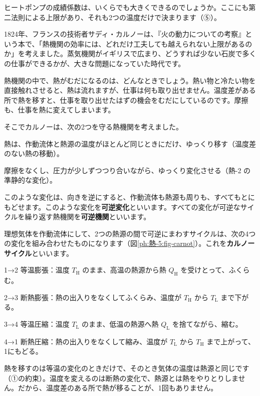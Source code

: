 ヒートポンプの成績係数は、いくらでも大きくできるのでしょうか。ここにも第二法則による上限があり、それも2つの温度だけで決まります（⑤）。

\label{ph:熱-5:sec5}
1824年、フランスの技術者サディ・カルノーは、『火の動力についての考察』という本で、「熱機関の効率には、どれだけ工夫しても越えられない上限があるのか」を考えました。蒸気機関がイギリスで広まり、どうすれば少ない石炭で多くの仕事ができるかが、大きな問題になっていた時代です。

熱機関の中で、熱がむだになるのは、どんなときでしょう。熱い物と冷たい物を直接触れさせると、熱は流れますが、仕事は何も取り出せません。温度差がある所で熱を移すと、仕事を取り出せたはずの機会をむだにしているのです。摩擦も、仕事を熱に変えてしまいます。

そこでカルノーは、次の2つを守る熱機関を考えました。
\begin{enumerate}[label={\bkcircled[bkBlue]{\arabic*}}, leftmargin=2.4\zw, itemsep=1pt, topsep=2pt]
\item 熱は、作動流体と熱源の温度がほとんど同じときにだけ、ゆっくり移す（温度差のない熱の移動）。
\item 摩擦をなくし、圧力が少しずつつり合いながら、ゆっくり変化させる（熱-2 の準静的な変化）。
\end{enumerate}
このような変化は、向きを逆にすると、作動流体も熱源も周りも、すべてもとにもどせます。このような変化を\textbf{可逆変化}といいます。すべての変化が可逆なサイクルを繰り返す熱機関を\textbf{可逆機関}といいます。

理想気体を作動流体にして、2つの熱源の間で可逆にまわすサイクルは、次の4つの変化を組み合わせたものになります（図\ref{ph:熱-5:fig-carnot}）。これを\textbf{カルノーサイクル}といいます。
\begin{enumerate}[label={\bkcircled[bkBlue]{\arabic*}}, leftmargin=2.4\zw, itemsep=1pt, topsep=2pt]
\item 1→2 等温膨張：温度 $T_{\mathrm H}$ のまま、高温の熱源から熱 $Q_{\mathrm H}$ を受けとって、ふくらむ。
\item 2→3 断熱膨張：熱の出入りをなくしてふくらみ、温度が $T_{\mathrm H}$ から $T_{\mathrm L}$ まで下がる。
\item 3→4 等温圧縮：温度 $T_{\mathrm L}$ のまま、低温の熱源へ熱 $Q_{\mathrm L}$ を捨てながら、縮む。
\item 4→1 断熱圧縮：熱の出入りをなくして縮み、温度が $T_{\mathrm L}$ から $T_{\mathrm H}$ まで上がって、1にもどる。
\end{enumerate}
熱を移すのは等温の変化のときだけで、そのとき気体の温度は熱源と同じです（①の約束）。温度を変えるのは断熱の変化で、熱源とは熱をやりとりしません。だから、温度差のある所で熱が移ることが、1回もありません。


